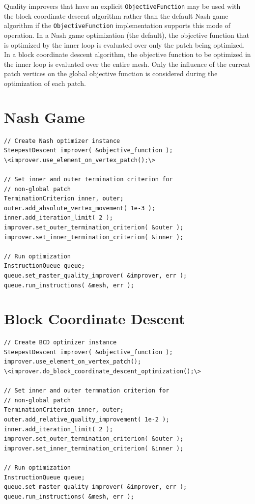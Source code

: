 Quality improvers that have an explicit \texttt{ObjectiveFunction} may be used with the block coordinate descent algorithm rather than the default Nash game algorithm if the \texttt{ObjectiveFunction} implementation supports this mode of operation. In a Nash game optimization (the default), the objective function that is optimized by the inner loop is evaluated over only the patch being optimized.  In a block coordinate descent algorithm, the objective function to be optimized in the inner loop is evaluated over the entire mesh.  Only the influence of the current patch vertices on the global objective function is considered during the optimization of each patch.

\section{Nash Game \label{sec:nash} }


\begin{lstlisting}[frame=single]
// Create Nash optimizer instance
SteepestDescent improver( &objective_function );
\<improver.use_element_on_vertex_patch();\>

// Set inner and outer termination criterion for 
// non-global patch
TerminationCriterion inner, outer;
outer.add_absolute_vertex_movement( 1e-3 );
inner.add_iteration_limit( 2 );
improver.set_outer_termination_criterion( &outer );
improver.set_inner_termination_criterion( &inner );

// Run optimization
InstructionQueue queue;
queue.set_master_quality_improver( &improver, err );
queue.run_instructions( &mesh, err );
\end{lstlisting}


\section{Block Coordinate Descent \label{sec:bcd} }

\begin{lstlisting}[frame=single]
// Create BCD optimizer instance
SteepestDescent improver( &objective_function );
improver.use_element_on_vertex_patch();
\<improver.do_block_coordinate_descent_optimization();\>

// Set inner and outer termnation criterion for 
// non-global patch
TerminationCriterion inner, outer;
outer.add_relative_quality_improvement( 1e-2 );
inner.add_iteration_limit( 2 );
improver.set_outer_termination_criterion( &outer );
improver.set_inner_termination_criterion( &inner );

// Run optimization
InstructionQueue queue;
queue.set_master_quality_improver( &improver, err );
queue.run_instructions( &mesh, err );
\end{lstlisting}


